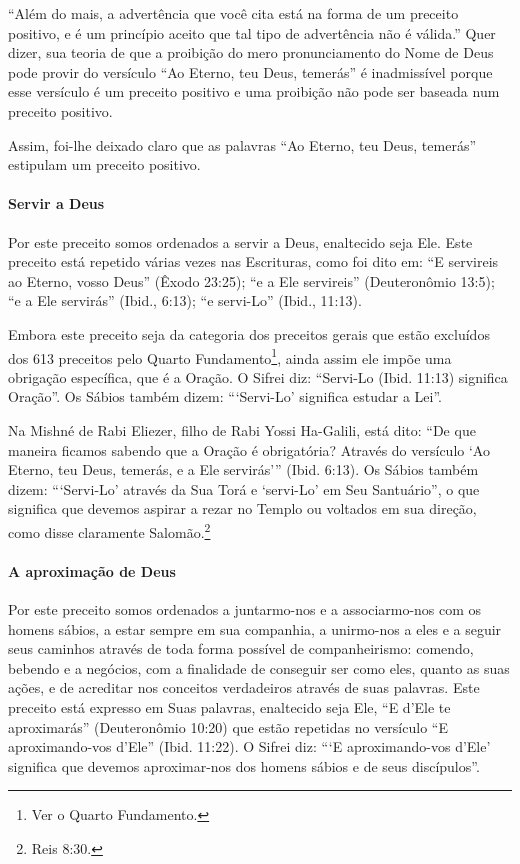 ``Além do mais, a advertência que você cita está na forma de um preceito
positivo, e é um princípio aceito que tal tipo de advertência não é
válida.'' Quer dizer, sua teoria de que a proibição do mero
pronunciamento do Nome de Deus pode provir do versículo ``Ao Eterno, teu
Deus, temerás'' é inadmissível porque esse versículo é um preceito
positivo e uma proibição não pode ser baseada num preceito positivo.

Assim, foi-lhe deixado claro que as palavras ``Ao Eterno, teu Deus,
temerás'' estipulam um preceito positivo.

\paragraph{Servir a Deus}

Por este preceito somos ordenados a servir a Deus, enaltecido seja Ele.
Este preceito está repetido várias vezes nas Escrituras, como foi dito
em: ``E servireis ao Eterno, vosso Deus'' (Êxodo 23:25); ``e a Ele
servireis'' (Deuteronômio 13:5); ``e a Ele servirás'' (Ibid., 6:13); ``e servi-Lo''
(Ibid., 11:13).

Embora este preceito seja da categoria dos preceitos gerais que estão excluídos dos 613 preceitos pelo Quarto
Fundamento\footnote{Ver o Quarto Fundamento.}, ainda assim ele impõe uma obrigação
específica, que é a Oração. O Sifrei diz: ``Servi-Lo (Ibid. 11:13)
significa Oração''. Os Sábios também dizem: ```Servi-Lo' significa
estudar a Lei''.

Na Mishné de Rabi Eliezer, filho de Rabi Yossi Ha-Galili, está dito:
``De que maneira ficamos sabendo que a Oração é obrigatória? Através do
versículo `Ao Eterno, teu Deus, temerás, e a Ele servirás''' (Ibid.
6:13). Os Sábios também dizem: ```Servi-Lo' através da Sua Torá e
`servi-Lo' em Seu Santuário'', o que significa que devemos aspirar a
rezar no Templo ou voltados em sua direção, como disse claramente
Salomão.\footnote{Reis 8:30.}

\paragraph{A aproximação de Deus}

Por este preceito somos ordenados a juntarmo-nos e a associarmo-nos com
os homens sábios, a estar sempre em sua companhia, a unirmo-nos a eles e
a seguir seus caminhos através de toda forma possível de
companheirismo: comendo, bebendo e a negócios, com a finalidade de
conseguir ser como eles, quanto as suas ações, e de acreditar nos
conceitos verdadeiros através de suas palavras. Este preceito está
expresso em Suas palavras, enaltecido seja Ele, ``E d'Ele te
aproximarás'' (Deuteronômio 10:20) que estão repetidas no versículo ``E
aproximando-vos d'Ele'' (Ibid. 11:22). O Sifrei diz: ```E
aproximando-vos d'Ele' significa que devemos aproximar-nos dos homens
sábios e de seus discípulos''.


